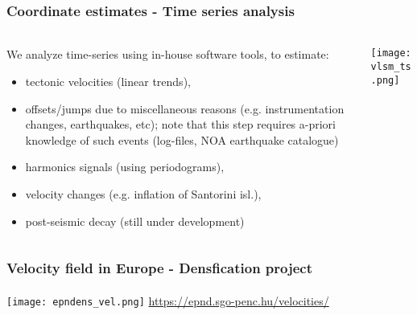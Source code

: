 \begin{frame}
  \frametitle{Coordinate estimates - Time series analysis}
  \framesubtitle{}
  \label{}
  \vskip-1cm
  \begin{columns}[T]
    \begin{column}{.4\textwidth}
      \footnotesize{
      We analyze time-series using in-house software tools, to estimate:
      \begin{itemize}
        \item tectonic velocities (linear trends),
        \item offsets/jumps due to miscellaneous reasons (e.g. instrumentation 
          changes, earthquakes, etc); note that this step requires a-priori 
          knowledge of such events (log-files, NOA earthquake catalogue)
        \item harmonics signals (using periodograms),
        \item velocity changes (e.g. inflation of Santorini isl.),
        \item post-seismic decay (still under development)
      \end{itemize}}
    \end{column}
    \begin{column}{.6\textwidth}
      \begin{center}
        \texttt{[image: vlsm\_ts.png]}
      \end{center}
    \end{column}
  \end{columns}
 
\end{frame}
\note{}

\begin{frame}
  \frametitle{Velocity field in Europe - Densfication project}
  \framesubtitle{}
  \label{}
  \begin{center}
    \texttt{[image: epndens\_vel.png]}
    \url{https://epnd.sgo-penc.hu/velocities/}
  \end{center}
\end{frame}
\note{}


